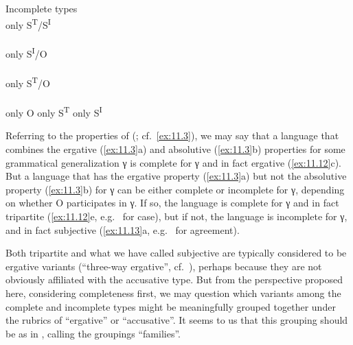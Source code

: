 \documentclass[output=paper]{langsci/langscibook}
\begin{document}
\ea%
    \label{ex:11.13}Incomplete types\\
    \ea only S\textsuperscript{T}/S\textsuperscript{I}
         \\
         \\
         
	\ex only S\textsuperscript{I}/O
         \\
         \\
         
	\ex only S\textsuperscript{T}/O
         \\
         \\
         
    \ex only O                    \tab{} 
    \ex only S\textsuperscript{T} \tab{} 
    \ex only S\textsuperscript{I} \tab{} 
	\z
\z

Referring to the  properties of \citeauthor{Deal2015}
(\citeyear{Deal2015}; cf.\ \ref{ex:11.3}), we may say that a language
that combines the ergative (\ref{ex:11.3}a) and absolutive
(\ref{ex:11.3}b) properties for some grammatical generalization γ is
complete for γ and in fact ergative (\ref{ex:11.12}c).  But a language that
has the ergative property (\ref{ex:11.3}a) but not the absolutive property
(\ref{ex:11.3}b) for γ can be either complete or incomplete for γ,
depending on whether O participates in γ. If so, the language is complete for γ
and in fact tripartite (\ref{ex:11.12}e, e.g.\  for case),
but if not, the language is incomplete for γ, and in fact subjective
(\ref{ex:11.13}a, e.g.\  for agreement).

Both tripartite and what we have called subjective are typically considered to
be ergative variants (\enquote{three-way ergative}, cf.\ \citealt{Deal2015}),
perhaps because they are not obviously affiliated with the accusative type. But
from the perspective proposed here, considering completeness first, we may
question which variants among the complete and incomplete types might be
meaningfully grouped together under the rubrics of \enquote{ergative} or
\enquote{accusative}.  It seems to us that this grouping should be as in ,
calling the groupings \enquote{families}.
\end{document}
